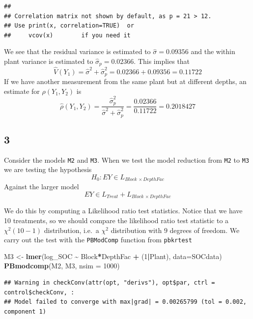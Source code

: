 \documentclass[
]{article}
\newenvironment{Shaded}{\begin{snugshade}}{\end{snugshade}}
\newcommand{\AttributeTok}[1]{\textcolor[rgb]{0.13,0.29,0.53}{#1}}
\newcommand{\DecValTok}[1]{\textcolor[rgb]{0.00,0.00,0.81}{#1}}
\newcommand{\FunctionTok}[1]{\textcolor[rgb]{0.13,0.29,0.53}{\textbf{#1}}}
\newcommand{\NormalTok}[1]{#1}
\newcommand{\OtherTok}[1]{\textcolor[rgb]{0.56,0.35,0.01}{#1}}
\newcommand{\SpecialCharTok}[1]{\textcolor[rgb]{0.81,0.36,0.00}{\textbf{#1}}}
\begin{document}
\begin{verbatim}
## 
## Correlation matrix not shown by default, as p = 21 > 12.
## Use print(x, correlation=TRUE)  or
##     vcov(x)        if you need it
\end{verbatim}

We see that the residual variance is estimated to
\(\hat{\sigma} = 0.09356\) and the within plant variance is estimated to
\(\hat{\sigma}_p = 0.02366\). This implies that \[
\hat{V}(Y_1) = \hat{\sigma}^2 + \hat{\sigma}^2_p = 0.02366+ 0.09356 = 0.11722
\] If we have another measurement from the same plant but at different
depths, an estimate for \(\rho(Y_1, Y_2)\) is \[
\hat{\rho}(Y_1, Y_2) = \frac{\hat{\sigma}^2_p}{\hat{\sigma}^2 + \hat{\sigma}^2_p} = \frac{0.02366}{0.11722} = 0.2018427
\]

\hypertarget{section-6}{%
\subsection{3}\label{section-6}}

Consider the models \texttt{M2} and \texttt{M3}. When we test the model
reduction from \texttt{M2} to \texttt{M3} we are testing the hypothesis
\[
H_0: EY \in  L_{Block \, \times DepthFac}
\] Against the larger model \[
EY \in L_{Treat} + L_{Block \, \times DepthFac}
\]

We do this by computing a Likelihood ratio test statistics. Notice that
we have 10 treatments, so we should compare the likelihood ratio test
statistic to a \(\chi^2 (10-1)\) distribution, i.e.~a \(\chi^2\)
distribution with \(9\) degrees of freedom. We carry out the test with
the \texttt{PBModComp} function from \texttt{pbkrtest}

\begin{Shaded}
\begin{Highlighting}[]
\NormalTok{M3 }\OtherTok{\textless{}{-}} \FunctionTok{lmer}\NormalTok{(log\_SOC }\SpecialCharTok{\textasciitilde{}}\NormalTok{ Block}\SpecialCharTok{*}\NormalTok{DepthFac }\SpecialCharTok{+}\NormalTok{ (}\DecValTok{1}\SpecialCharTok{|}\NormalTok{Plant), }\AttributeTok{data=}\NormalTok{SOCdata)}
\FunctionTok{PBmodcomp}\NormalTok{(M2, M3, }\AttributeTok{nsim =} \DecValTok{1000}\NormalTok{)}
\end{Highlighting}
\end{Shaded}

\begin{verbatim}
## Warning in checkConv(attr(opt, "derivs"), opt$par, ctrl = control$checkConv, :
## Model failed to converge with max|grad| = 0.00265799 (tol = 0.002, component 1)
\end{verbatim}
\end{document}
